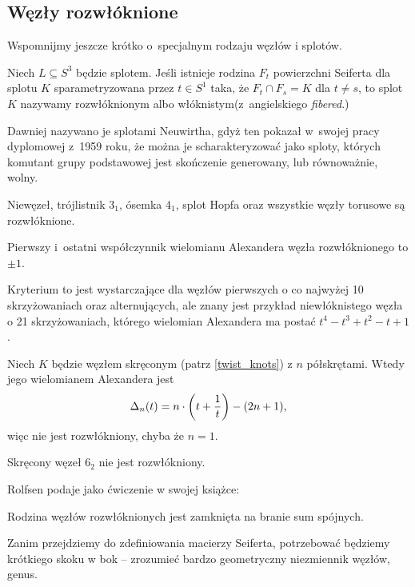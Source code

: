 \subsection{Węzły rozwłóknione}
Wspomnijmy jeszcze krótko o~specjalnym rodzaju węzłów i splotów.

\begin{definition}
    Niech $L \subseteq S^3$ będzie splotem.
    Jeśli istnieje rodzina $F_t$ powierzchni Seiferta dla splotu $K$ sparametryzowana przez $t \in S^1$ taka, że $F_t \cap F_s = K$ dla $t \neq s$, to splot $K$ nazywamy rozwłóknionym albo włóknistym(z~angielskiego \emph{fibered}.)
\end{definition}

Dawniej nazywano je splotami Neuwirtha, gdyż ten pokazał w~swojej pracy dyplomowej z~1959 roku, że można je scharakteryzować jako sploty, których komutant grupy podstawowej jest skończenie generowany, lub równoważnie, wolny.

\begin{example}
	Niewęzeł, trójlistnik $3_1$, ósemka $4_1$, splot Hopfa oraz wszystkie węzły torusowe są rozwłóknione.
\end{example}

\begin{proposition}
    Pierwszy i~ostatni współczynnik wielomianu Alexandera węzła rozwłóknionego to $\pm 1$.
\end{proposition}

Kryterium to jest wystarczające dla węzłów pierwszych o co najwyżej 10 skrzyżowaniach oraz alternujących, ale znany jest przykład niewłóknistego węzła o 21 skrzyżowaniach, którego wielomian Alexandera ma postać $t^4 - t^3 + t^2 - t +1$.

\begin{proposition}
	Niech $K$ będzie węzłem skręconym (patrz \ref{twist_knots}) z $n$ półskrętami.
	Wtedy jego wielomianem Alexandera jest
	\begin{equation}
	    \Delta_n(t) = n \cdot \left(t + \frac 1 t\right)  - (2n+1),
	\end{equation}
	więc nie jest rozwłókniony, chyba że $n = 1$.
\end{proposition}

\begin{corollary}
	Skręcony węzeł $6_2$ nie jest rozwłókniony.
\end{corollary}

Rolfsen podaje jako ćwiczenie w swojej książce:

\begin{proposition}
    Rodzina węzłów rozwłóknionych jest zamknięta na branie sum spójnych.
\end{proposition}

Zanim przejdziemy do zdefiniowania macierzy Seiferta, potrzebować będziemy krótkiego skoku w bok -- zrozumieć bardzo geometryczny niezmiennik węzłów, genus.